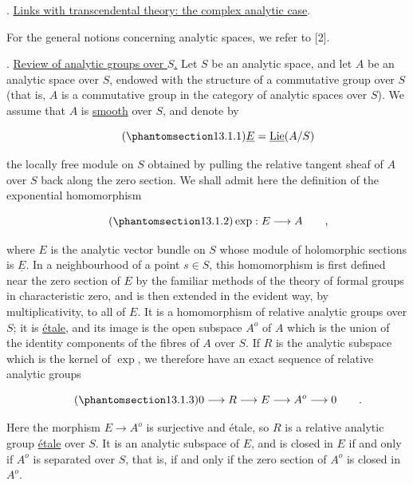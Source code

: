 \medskip
{}. \underline{Links with transcendental theory: the complex analytic
case}.

For the general notions concerning analytic spaces, we refer to [2].

\medskip
\noindent
{}. \underline{Review of analytic groups over $S$.} Let $S$ be an
analytic space, and let $A$ be an analytic space over $S$, endowed with
the structure of a commutative group over $S$ (that is, $A$ is a
commutative group in the category of analytic spaces over $S$). We assume
that $A$ is \underline{smooth} over $S$, and denote by

\begin{equation}\tag{\SGARefTarget{sga7.sga7i.eix.n13-1-1}{13.1.1}}
 \underline E=\underline{\operatorname{Lie}}(A/S)
\end{equation}

\noindent
the locally free module on $S$ obtained by pulling the relative tangent
sheaf of $A$ over $S$ back along the zero section. We shall admit here the
definition of the exponential homomorphism

\begin{equation}\tag{\SGARefTarget{sga7.sga7i.eix.n13-1-2}{13.1.2}}
 \exp:E\longrightarrow A\qquad ,
\end{equation}

\noindent
where $E$ is the analytic vector bundle on $S$ whose module of
holomorphic sections is $\underline E$. In a neighbourhood of a point
$s\in S$, this homomorphism is first defined near the zero section of $E$
by the familiar methods of the theory of formal groups in characteristic
zero, and is then extended in the evident way, by multiplicativity, to
all of $E$. It is a homomorphism of relative analytic groups over $S$;
it is \underline{\'etale}, and its image is the open subspace $A^o$ of
$A$ which is the union of the identity components of the fibres of $A$
over $S$. If $R$ is the analytic subspace which is the kernel of $\exp$,
we therefore have an exact sequence of relative analytic groups

\begin{equation}\tag{\SGARefTarget{sga7.sga7i.eix.n13-1-3}{13.1.3}}
 0\longrightarrow R\longrightarrow E\longrightarrow A^o
 \longrightarrow0\qquad .
\end{equation}

\noindent
Here the morphism $E\longrightarrow A^o$ is surjective and \'etale, so
$R$ is a relative analytic group \underline{\'etale} over $S$. It is an
analytic subspace of $E$, and is closed in $E$ if and only if $A^o$ is
separated over $S$, that is, if and only if the zero section of $A^o$ is
closed in $A^o$.

